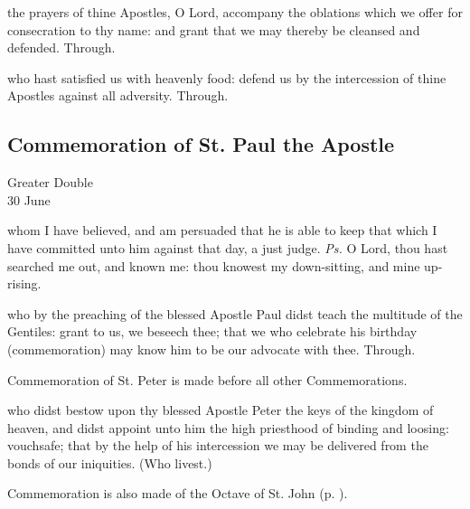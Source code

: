 
\secret
{} the prayers of thine Apostles, O Lord, accompany the oblations which we offer for consecration to thy name: and grant that we may thereby be cleansed and defended. Through.


\postcommunion
{} who hast satisfied us with heavenly food: defend us by the intercession of thine Apostles against all adversity. Through.



\subsection{Commemoration of St. Paul the Apostle}
\begin{inhead}
    {Greater Double\\
30 June}
\end{inhead}

\introit
{} whom I have believed, and am persuaded that he is able to keep that which I have committed unto him against that day, a just judge. \textit{Ps.} O Lord, thou hast searched me out, and known me: thou knowest my down-sitting, and mine up-rising.

\collect
{} who by the preaching of the blessed Apostle Paul didst teach the multitude of the Gentiles: grant to us, we beseech thee; that we who celebrate his birthday (commemoration) may know him to be our advocate with thee. Through.

\begin{rubric}
	Commemoration of St. Peter is made before all other Commemorations.
\end{rubric}

 who didst bestow upon thy blessed Apostle Peter the keys of the kingdom of heaven, and didst  appoint unto him the high priesthood of binding and loosing: vouchsafe; that by the help of his intercession we may be delivered from the bonds of our iniquities. (Who livest.)
\begin{rubric}
	Commemoration is also made of the Octave of St. John (p. \pageref{JohnCollect}).
\end{rubric}

